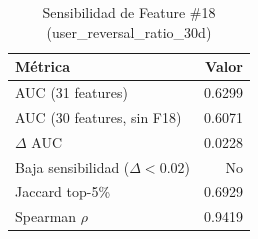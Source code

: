 \begin{table}[htbp]
\centering
\small
\caption{Sensibilidad de Feature \#18 (user\_reversal\_ratio\_30d)}
\label{tab:sensitivity-f18}
\begin{tabular}{lr}
\toprule
Métrica & Valor \\
\midrule
  AUC (31 features) & 0.6299 \\
  AUC (30 features, sin F18) & 0.6071 \\
  $\Delta$ AUC & 0.0228 \\
  Baja sensibilidad ($\Delta < 0.02$) & No \\
  Jaccard top-5\% & 0.6929 \\
  Spearman $\rho$ & 0.9419 \\
\bottomrule
\end{tabular}
\end{table}
